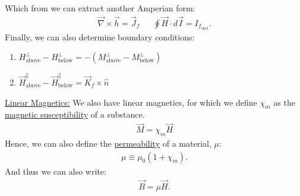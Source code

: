 \documentclass{article}
\newcommand{\sheader}[1]{\underline{#1:}}
\begin{document}
Which from we can extract another Amperian form:
\begin{align*}
    \vec{\nabla} \times \vec{h} = \vec{J}_f && \oint \vec{H} \cdot d\vec{I} = I_{f_\textrm{encl}}.
\end{align*}
Finally, we can also determine boundary conditions:
\begin{enumerate}[label=(\alph*)]
    \item $H^\perp_\textrm{above} - H_\textrm{below}^\perp = - (M^\perp_\textrm{above} - M^\perp_\textrm{below})$
    \item $\vec{H}_\textrm{above}^\parallel - \vec{H}_\textrm{below}^\parallel = \vec{K}_f \times \hat{n}$
\end{enumerate}
\sheader{Linear Magnetics} We also have linear magnetics, for which we define $\chi_m$ as the 
\underline{magnetic susceptibility} of a substance. 
\begin{align*}
    \vec{M} = \chi_m\vec{H}
\end{align*}
Hence, we can also define the \underline{permeability} of a material, $\mu$:
\begin{align*}
    \mu \equiv \mu_0(1 + \chi_m).
\end{align*}
And thus we can also write:
\begin{align*}
    \vec{B} = \mu \vec{H}.
\end{align*}

\pagebreak
\end{document}
